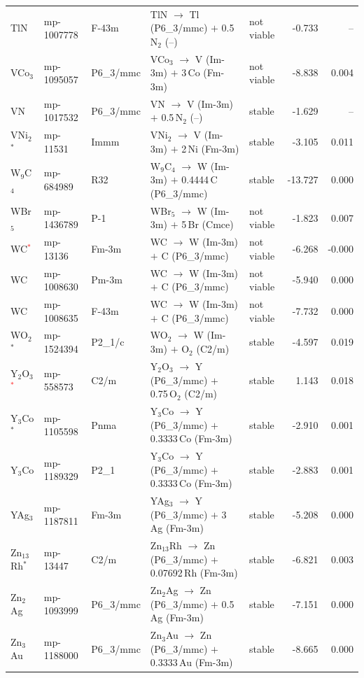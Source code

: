 \begin{longtable}{@{}ll l@{\hspace{4pt}} p{4.6cm} l@{\hspace{4pt}} rr@{}}
TlN & mp-1007778 & F-43m & TlN $\to$ Tl (P6\_3/mmc) $+$ 0.5\,N$_{2}$ (--) & not viable & -0.733 & -- \\
VCo$_{3}$ & mp-1095057 & P6\_3/mmc & VCo$_{3}$ $\to$ V (Im-3m) $+$ 3\,Co (Fm-3m) & not viable & -8.838 & 0.004 \\
VN & mp-1017532 & P6\_3/mmc & VN $\to$ V (Im-3m) $+$ 0.5\,N$_{2}$ (--) & stable & -1.629 & -- \\
VNi$_{2}$$^*$ & mp-11531 & Immm & VNi$_{2}$ $\to$ V (Im-3m) $+$ 2\,Ni (Fm-3m) & stable & -3.105 & 0.011 \\
W$_{9}$C$_{4}$ & mp-684989 & R32 & W$_{9}$C$_{4}$ $\to$ W (Im-3m) $+$ 0.4444\,C (P6\_3/mmc) & stable & -13.727 & 0.000 \\
WBr$_{5}$ & mp-1436789 & P-1 & WBr$_{5}$ $\to$ W (Im-3m) $+$ 5\,Br (Cmce) & not viable & -1.823 & 0.007 \\
WC\textcolor{red}{$^*$} & mp-13136 & Fm-3m & WC $\to$ W (Im-3m) $+$ C (P6\_3/mmc) & not viable & -6.268 & -0.000 \\
WC & mp-1008630 & Pm-3m & WC $\to$ W (Im-3m) $+$ C (P6\_3/mmc) & not viable & -5.940 & 0.000 \\
WC & mp-1008635 & F-43m & WC $\to$ W (Im-3m) $+$ C (P6\_3/mmc) & not viable & -7.732 & 0.000 \\
WO$_{2}$$^*$ & mp-1524394 & P2\_1/c & WO$_{2}$ $\to$ W (Im-3m) $+$ O$_{2}$ (C2/m) & stable & -4.597 & 0.019 \\
Y$_{2}$O$_{3}$\textcolor{red}{$^*$} & mp-558573 & C2/m & Y$_{2}$O$_{3}$ $\to$ Y (P6\_3/mmc) $+$ 0.75\,O$_{2}$ (C2/m) & stable & 1.143 & 0.018 \\
Y$_{3}$Co$^*$ & mp-1105598 & Pnma & Y$_{3}$Co $\to$ Y (P6\_3/mmc) $+$ 0.3333\,Co (Fm-3m) & stable & -2.910 & 0.001 \\
Y$_{3}$Co & mp-1189329 & P2\_1 & Y$_{3}$Co $\to$ Y (P6\_3/mmc) $+$ 0.3333\,Co (Fm-3m) & stable & -2.883 & 0.001 \\
YAg$_{3}$ & mp-1187811 & Fm-3m & YAg$_{3}$ $\to$ Y (P6\_3/mmc) $+$ 3\,Ag (Fm-3m) & stable & -5.208 & 0.000 \\
Zn$_{13}$Rh$^*$ & mp-13447 & C2/m & Zn$_{13}$Rh $\to$ Zn (P6\_3/mmc) $+$ 0.07692\,Rh (Fm-3m) & stable & -6.821 & 0.003 \\
Zn$_{2}$Ag & mp-1093999 & P6\_3/mmc & Zn$_{2}$Ag $\to$ Zn (P6\_3/mmc) $+$ 0.5\,Ag (Fm-3m) & stable & -7.151 & 0.000 \\
Zn$_{3}$Au & mp-1188000 & P6\_3/mmc & Zn$_{3}$Au $\to$ Zn (P6\_3/mmc) $+$ 0.3333\,Au (Fm-3m) & stable & -8.665 & 0.000 \\

\end{longtable}
